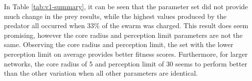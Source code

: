 In Table \ref{tab:v1-summary}, it can be seen that the parameter set did not provide much change in the prey results, while the highest values produced by the predator all occurred when 33\% of the swarm was charged. This result does seem promising, however the core radius and perception limit parameters are not the same. Observing the core radius and perception limit, the set with the lower perception limit on average provides better fitness scores. Furthermore, for larger networks, the core radius of 5 and perception limit of 30 seems to perform better than the other variation when all other parameters are identical.

